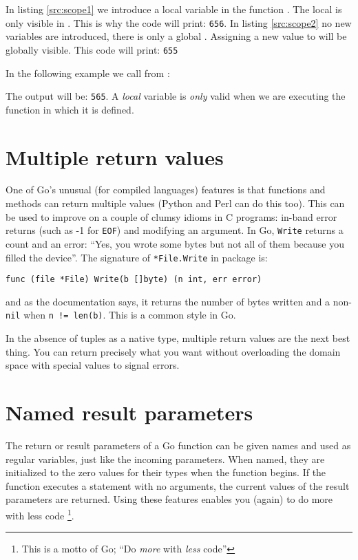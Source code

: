 In listing \ref{src:scope1} we introduce a local variable 
in the function .
The local  is only visible in . This is
why the code will print: \texttt{656}.
In listing \ref{src:scope2} no new variables are introduced, there
is only a global .
Assigning a new value to  will be globally visible. This code will
print: \texttt{655}

In the following example we call  from :



The output will be: \texttt{565}. A \emph{local} variable is \emph{only}
valid when we are executing the function in which it is defined. 

\section{Multiple return values}
\label{sec:multiple return}
One of Go's unusual (for compiled languages) features is that functions and methods can return multiple
values (Python and Perl can do this too). This can be used to improve on a couple of 
clumsy idioms in C programs:
in-band error returns (such as -1 for \texttt{EOF}) and modifying an argument.
In Go, \lstinline{Write} returns a count and an
error: ``Yes, you wrote some bytes but not all of them because you filled the
device''. The signature of \lstinline{*File.Write} in package
 is:
\begin{lstlisting}
func (file *File) Write(b []byte) (n int, err error)
\end{lstlisting}
and as the documentation says, it returns the number of bytes written and a
non-\lstinline{nil}  when \lstinline{n != len(b)}. This is a common
style in Go.

In the absence of tuples as a native type, multiple return values are the next
best thing. You can return precisely what you want without
overloading the domain space with special values to signal errors.

\section{Named result parameters}
\label{sec:named result parameters}
The return or result parameters of a Go function can be given names and used
as regular variables, just like the incoming parameters. When named, they are
initialized to the zero values for their types when the function begins. If the
function executes a  statement with no arguments, the current values of
the result parameters are returned. Using these
features enables you (again) to do more with less code \footnote{This is
a motto of Go; ``Do \emph{more} with \emph{less} code''}.

